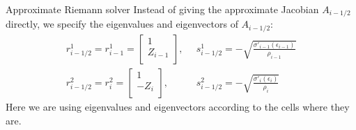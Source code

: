 \documentclass{beamer}
\begin{document}
\begin{frame}{Approximate Riemann solver}
Instead of giving the approximate Jacobian $A_{i-1/2}$ directly, we specify the eigenvalues and eigenvectors of $A_{i-1/2}$:
\begin{align}
r^1_{i-1/2}=r^1_{i-1}=\left[
                        \begin{array}{c}
                          1 \\ Z_{i-1} \\
                        \end{array}
                      \right], & \,\,\, s^1_{i-1/2}=-\sqrt{\frac{\sigma'_{i-1}(\epsilon_{i-1})}{\rho_{i-1}}}\\
r^2_{i-1/2}=r^2_{i}=\left[
                        \begin{array}{c}
                          1 \\ -Z_{i} \\
                        \end{array}
                      \right], &\,\,\, s^2_{i-1/2}=-\sqrt{\frac{\sigma'_{i}(\epsilon_{i})}{\rho_{i}}}
\end{align}
Here we are using eigenvalues and eigenvectors according to the cells where they are.
\end{frame}
\end{document}
